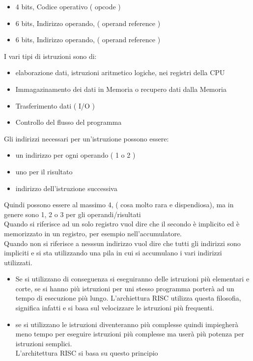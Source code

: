 \documentclass[12pt, a4paper]{report}
\begin{document}
\begin{itemize}
	\item 4 bits, Codice operativo ( opcode ) 
	\item 6 bits, Indirizzo operando, ( operand reference )
	\item 6 bits, Indirizzo operando, ( operand reference ) 
\end{itemize}

I vari tipi di istruzioni sono di:

\begin{itemize}
	\item elaborazione dati, istruzioni aritmetico logiche, nei registri della
		CPU
	\item Immagazinamento dei dati in Memoria o recupero dati dalla Memoria
	\item Trasferimento dati ( I/O ) 
	\item Controllo del flusso del programma		
\end{itemize}
Gli indirizzi necessari per un'istruzione possono essere:

\begin{itemize}
	\item un indirizzo per ogni operando ( 1 o 2 ) 
	\item uno per il risultato
	\item indirizzo dell'istruzione successiva
\end{itemize}
Quindi possono essere al massimo 4, ( cosa molto rara e dispendiosa), ma in genere
sono 1, 2 o 3 per gli operandi/risultati\\
Quando si riferisce ad un solo registro vuol dire che il secondo è implicito ed è 
memorizzato in un registro, per esempio nell'accumulatore.\\
Quando non si riferisce a nesssun indirizzo vuol dire che tutti gli indirizzi sono
impliciti e si sta utilizzando una pila in cui si accumulano i vari indirizzi
utilizzati.\\

\begin{itemize}
	\item Se si utilizzano  di conseguenza si eseguiranno
		delle istruzioni più elementari e corte, se si hanno 
		più istruzioni per uni stesso programma porterà ad un tempo 
		di esecuzione più lungo. L'archiettura RISC utilizza questa 
		filosofia, significa infatti 
		e si basa sul velocizzare le istruzioni più frequenti.
	\item se si utilizzano  le istruzioni diventeranno 
		più complesse quindi impiegherà meno tempo per eseguire istruzioni
		più complesse ma userà più potenza per istruzioni semplici.\\
		L'architettura RISC si basa su questo principio 
\end{itemize}
\end{document}
